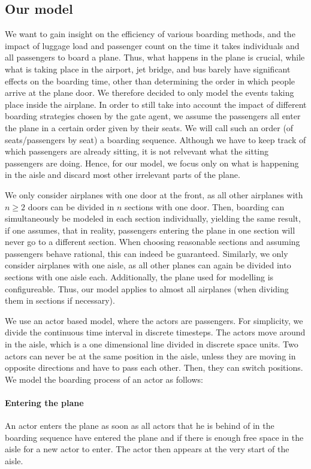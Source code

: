 \documentclass[11pt]{article}
\begin{document}
\subsection{Our model}

We want to gain insight on the efficiency of various boarding methods, and the impact of luggage load and passenger count on the time it takes individuals and all passengers to board a plane. Thus, what happens in the plane is crucial, while what is taking place in the airport, jet bridge, and bus barely have significant effects on the boarding time, other than determining the order in which people arrive at the plane door. We therefore decided to only model the events taking place inside the airplane. In order to still take into account the impact of different boarding strategies chosen by the gate agent, we assume the passengers all enter the plane in a certain order given by their seats. We will call such an order (of seats/passengers by seat) a boarding sequence.
Although we have to keep track of which passengers are already sitting, it is not relvevant what the sitting passengers are doing. Hence, for our model, we focus only on what is happening in the aisle and discard most other irrelevant parts of the plane.

We only consider airplanes with one door at the front, as all other airplanes with $n \geq 2$ doors can be divided in $n$ sections with one door. Then, boarding can simultaneously be modeled in each section individually, yielding the same result, if one assumes, that in reality, passengers entering the plane in one section will never go to a different section.
When choosing reasonable sections and assuming passengers behave rational, this can indeed be guaranteed. Similarly, we only consider airplanes with one aisle, as all other planes can again be divided into sections with one aisle each. Additionally, the plane used for modelling is configureable. Thus, our model applies to almost all airplanes (when dividing them in sections if necessary).

We use an actor based model, where the actors are passengers. For simplicity, we divide the continuous time interval in discrete timesteps. The actors move around in the aisle, which is a one dimensional line divided in discrete space units. Two actors can never be at the same position in the aisle, unless they are moving in opposite directions and have to pass each other. Then, they can switch positions. We model the boarding process of an actor as follows:

\paragraph{Entering the plane}
An actor enters the plane as soon as all actors that he is behind of in the boarding sequence  have entered the plane and if there is enough free space in the aisle for a new actor to enter. The actor then appears at the very start of the aisle.
\end{document}
